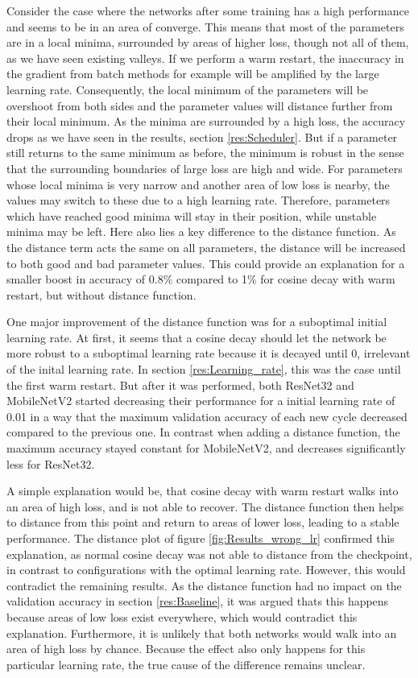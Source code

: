 Consider the case where the networks after some training has a high performance
and seems to be in an area of converge. This means that most of the parameters
are in a local minima, surrounded by areas of higher loss, though not all of
them, as we have seen existing valleys. If we perform a warm restart, the
inaccuracy in the gradient from batch methods for example will be amplified by
the large learning rate. Consequently, the local minimum of the parameters will
be overshoot from both sides and the parameter values will distance further from
their local minimum. As the minima are surrounded by a high loss, the accuracy
drops as we have seen in the results, section \ref{res:Scheduler}. But if a
parameter still returns to the same minimum as before, the minimum is robust in
the sense that the surrounding boundaries of large loss are high and wide. For
parameters whose local minima is very narrow and another area of low loss is
nearby, the values may switch to these due to a high learning rate. Therefore,
parameters which have reached good minima will stay in their position, while
unstable minima may be left. Here also lies a key difference to the distance
function. As the distance term acts the same on all parameters, the distance
will be increased to both good and bad parameter values. This could provide an
explanation for a smaller boost in accuracy of 0.8\% compared to 1\% for cosine
decay with warm restart, but without distance function.
\newline

One major improvement of the distance function was for a suboptimal initial learning
rate. At first, it seems that a cosine decay should let the network be more
robust to a suboptimal learning rate because it is decayed until 0, irrelevant of the
inital learning rate. In section \ref{res:Learning_rate}, this was the case
until the first warm restart. But after it was performed, both ResNet32 and
MobileNetV2 started decreasing their performance for a initial learning rate of 0.01 in a way that
the maximum validation accuracy of each new cycle decreased compared to the previous
one. In contrast when adding a distance function, the maximum accuracy stayed
constant for MobileNetV2, and decreases significantly less for ResNet32.

A simple explanation would be, that cosine decay with warm restart walks into an
area of high loss, and is not able to recover. The distance function then helps
to distance from this point and return to areas of lower loss, leading to a
stable performance. The distance plot of figure \ref{fig:Results_wrong_lr}
confirmed this explanation, as normal cosine decay was not able to distance from the
checkpoint, in contrast to configurations with the optimal learning rate.
However, this would contradict the remaining results. As the distance
function had no impact on the validation accuracy in section \ref{res:Baseline},
it was argued thats this happens because areas of low loss exist everywhere,
which would contradict this explanation. Furthermore, it is unlikely that both
networks would walk into an area of high loss by chance. Because the effect also
only happens for this particular learning rate, the true cause of the difference
remains unclear.
\newline

